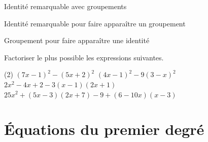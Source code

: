 \documentclass[a4paper,12pt]{article}
\begin{document}
\begin{exemple}Identité remarquable avec groupements
	\tcblower
	\vspace{6cm}	

\end{exemple}

\begin{exemple}
	 Identité remarquable pour faire apparaître un groupement
	\tcblower
	\vspace{8cm}	

\end{exemple}

\begin{exemple}
	Groupement pour faire apparaître une identité
	\tcblower
	\vspace{7cm}	

\end{exemple}

\begin{exercice}
	\tcblower
Factoriser le plus possible les expressions suivantes.
  \begin{tasks}(2)
  	\task $(7x-1)^2-(5x+2)^2$
	\task $(4x-1)^2-9(3-x)^2$
	\task* $2x^2-4x+2-3(x-1)(2x+1)$
	\task* $25x^2+(5x-3)(2x+7)-9+(6-10x)(x-3)$
  \end{tasks}
\end{exercice}

\section{Équations du premier degré}
\end{document}
